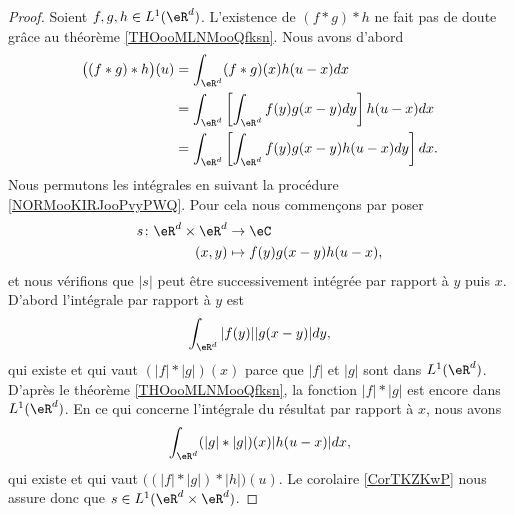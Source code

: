 \begin{proof}
	Soient \( f,g,h\in L^1(\eR^d)\). L'existence de \( (f*g)*h\) ne fait pas de doute grâce au théorème \ref{THOooMLNMooQfksn}. Nous avons d'abord
	\begin{subequations}
		\begin{align}
			\big( (f*g)*h \big)(u) & =\int_{\eR^d}(f*g)(x)h(u-x)dx                                                                  \\
			                       & =\int_{\eR^d}\left[ \int_{\eR^d}f(y)g(x-y)dy \right]h(u-x)dx                                   \\
			                       & =\int_{\eR^d}\left[ \int_{\eR^d}f(y)g(x-y)h(u-x)dy \right]dx.      \label{SUBEQooJKRHooDaScXV}
		\end{align}
	\end{subequations}
	Nous permutons les intégrales en suivant la procédure \ref{NORMooKIRJooPvyPWQ}. Pour cela nous commençons par poser
	\begin{equation}
		\begin{aligned}
			s\colon \eR^d\times \eR^d & \to \eC                   \\
			(x,y)                     & \mapsto f(y)g(x-y)h(u-x),
		\end{aligned}
	\end{equation}
	et nous vérifions que \( | s |\) peut être successivement intégrée par rapport à \( y\) puis \( x\). D'abord l'intégrale par rapport à \( y\) est
	\begin{equation}
		\int_{\eR^d}| f(y) | |g(x-y) |dy,
	\end{equation}
	qui existe et qui vaut \(   (| f |*| g |)(x)   \) parce que \( | f |\) et \( | g |\) sont dans \( L^1(\eR^d)\). D'après le théorème \ref{THOooMLNMooQfksn}, la fonction \( | f |*| g |\) est encore dans \( L^1(\eR^d)\). En ce qui concerne l'intégrale du résultat par rapport à \( x\), nous avons
	\begin{equation}
		\int_{\eR^d}(| g |*| g |)(x)| h(u-x) |dx,
	\end{equation}
	qui existe et qui vaut \( \big( (| f |*| g |)*| h |\big)(u)\). Le corolaire \ref{CorTKZKwP} nous assure donc que \( s\in L^1(\eR^d\times \eR^d)\).


\end{proof}
